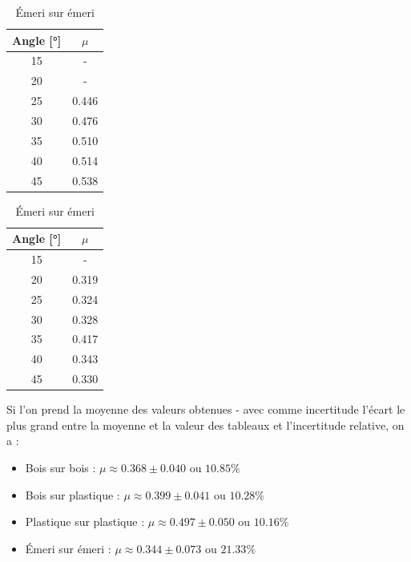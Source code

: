 \documentclass[twoside,twocolumn]{article}
\begin{document}
\begin{table}
\centering
\caption{Plastique sur plastique}
\begin{tabular}{|c|c|}
\hline
Angle [°] &$\mu$ \\
           \hline   \hline
15        &- \\
           \hline
20        &- \\
           \hline
25        &0.446 \\
           \hline
30        &0.476 \\
           \hline
35        &0.510 \\
           \hline
40        &0.514 \\
           \hline
45        &0.538 \\
           \hline
\end{tabular}
\label{table:coeffpp}

\caption{Émeri sur émeri}
\begin{tabular}{|c|c|}
\hline
Angle [°] &$\mu$ \\
           \hline   \hline
15        &- \\
           \hline
20        &0.319 \\
           \hline
25        &0.324 \\
           \hline
30        &0.328 \\
           \hline
35        &0.417 \\
           \hline
40        &0.343 \\
           \hline
45        &0.330 \\
           \hline
\end{tabular}
\label{table:coeffee}
\end{table}

Si l'on prend la moyenne des valeurs obtenues - avec comme incertitude l'écart le plus grand entre la moyenne et la valeur des tableaux et l'incertitude relative, on a :
\begin{itemize}
\item Bois sur bois : $\mu \approx 0.368 \pm 0.040$ ou $10.85\%$
\item Bois sur plastique : $\mu \approx 0.399 \pm 0.041$ ou $10.28\%$
\item Plastique sur plastique : $\mu \approx 0.497 \pm 0.050$ ou $10.16\%$
\item Émeri sur émeri : $\mu \approx 0.344 \pm 0.073$ ou $21.33\%$
\end{itemize}

\end{document}
